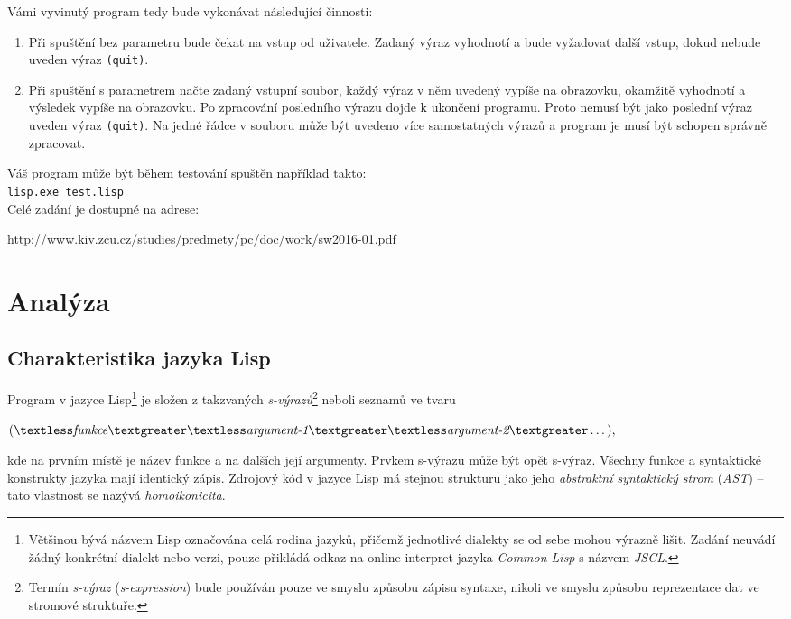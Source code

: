 \documentclass[12pt, a4paper]{report}
\newcommand{\lt}{\textless}
\newcommand{\gt}{\textgreater}
\begin{document}
\noindent
Vámi vyvinutý program tedy bude vykonávat následující činnosti:
\begin{enumerate}
	\item Při spuštění bez parametru bude čekat na vstup od uživatele. Zadaný výraz vyhodnotí a bude vyžadovat další vstup, dokud nebude uveden výraz \verb|(quit)|.
	\item Při spuštění s parametrem načte zadaný vstupní soubor, každý výraz v něm uvedený vypíše na obrazovku, okamžitě vyhodnotí a výsledek vypíše na obrazovku. Po zpracování posledního výrazu dojde k ukončení programu. Proto nemusí být jako poslední výraz uveden výraz \verb|(quit)|. Na jedné řádce v souboru může být uvedeno více samostatných výrazů a program je musí být schopen správně zpracovat.
\end{enumerate}

\noindent
Váš program může být během testování spuštěn například takto:\\

\noindent
\verb|lisp.exe test.lisp|\\

\noindent
Celé zadání je dostupné na adrese:

\mbox{\url{http://www.kiv.zcu.cz/studies/predmety/pc/doc/work/sw2016-01.pdf}}


\chapter{Analýza}
\section{Charakteristika jazyka Lisp}
Program v jazyce Lisp\footnote{Většinou bývá názvem Lisp označována celá rodina jazyků, přičemž jednotlivé dialekty se od sebe mohou výrazně lišit. Zadání neuvádí žádný konkrétní dialekt nebo verzi, pouze přikládá odkaz na online interpret jazyka \emph{Common Lisp} s názvem \emph{JSCL}.} je složen z takzvaných \emph{s-výrazů}\footnote{Termín \emph{s-výraz} (\emph{s-expression}) bude používán pouze ve smyslu způsobu zápisu syntaxe, nikoli ve smyslu způsobu reprezentace dat ve stromové struktuře.} neboli seznamů ve tvaru

\vspace{5pt}
\centerline{$(\lt\emph{funkce}\gt \lt\emph{argument-1}\gt \lt\emph{argument-2}\gt \dots),$}
\vspace{5pt}
\noindent
kde na prvním místě je název funkce a na dalších její argumenty. Prvkem s-výrazu může být opět s-výraz. Všechny funkce a syntaktické konstrukty jazyka mají identický zápis. Zdrojový kód v jazyce Lisp má stejnou strukturu jako jeho \emph{abstraktní syntaktický strom} (\emph{AST}) – tato vlastnost se nazývá \emph{homoikonicita}.
\end{document}
